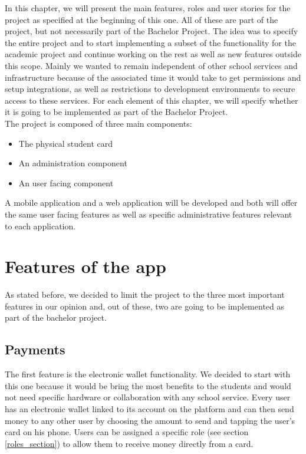 \documentclass[twoside, openright,11pt,a4paper]{book}
\begin{document}
In this chapter, we will present the main features, roles and user stories for the project as specified at the beginning of this one. All of these are part of the project, but not necessarily part of the Bachelor Project. The idea was to specify the entire project and to start implementing a subset of the functionality for the academic project and continue working on the rest as well as new features outside this scope. Mainly we wanted to remain independent of other school services and infrastructure because of the associated time it would take to get permissions and setup integrations, as well as restrictions to development environments to secure access to these services. For each element of this chapter, we will specify whether it is going to be implemented as part of the Bachelor Project.\\

The project is composed of three main components:
\begin{itemize}
    \item The physical student card
    \item An administration component
    \item An user facing component
\end{itemize}

A mobile application and a web application will be developed and both will offer the same user facing features as well as specific administrative features relevant to each application.

\section{Features of the app}
As stated before, we decided to limit the project to the three most important features in our opinion and, out of these, two are going to be implemented as part of the bachelor project.

\subsection{Payments}

The first feature is the electronic wallet functionality. We decided to start with this one because it would be bring the most benefits to the students and would not need specific hardware or collaboration with any school service. Every user has an electronic wallet linked to its account on the platform and can then send money to any other user by choosing the amount to send and tapping the user's card on his phone. Users can be assigned a specific role (see section \ref{roles_section}) to allow them to receive money directly from a card.\\
\end{document}
